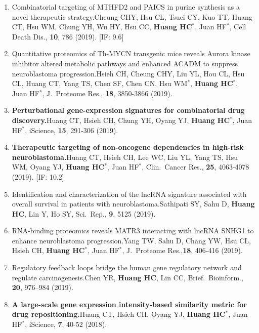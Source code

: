 \documentclass[10pt,a4paper]{article}
\def\mypub#1#2#3{{#1.}\newline #2, #3.}
\def\mybpub#1#2#3{{\boldmath \bf #1.}\newline #2, #3.}
\begin{document}
\begin{enumerate}
\item
\mypub{Combinatorial targeting of MTHFD2 and PAICS in purine synthesis as a novel therapeutic strategy}
{Cheung CHY, Hsu CL, Tsuei CY, Kuo TT, Huang CT, Hsu WM, Chung YH, Wu HY, Hsu CC, {\bf Huang HC$^*$}, Juan HF$^*$}
{Cell Death Dis., {\bf 10}, 786 (2019)} 
[IF: 9.6]

\item
\mypub{Quantitative proteomics of Th-MYCN transgenic mice reveals Aurora kinase inhibitor altered metabolic pathways and enhanced ACADM to suppress neuroblastoma progression}
{Hsieh CH, Cheung CHY, Liu YL, Hou CL, Hsu CL, Huang CT, Yang TS, Chen SF, Chen CN, Hsu WM$^*$, {\bf Huang HC$^*$}, Juan HF$^*$}
{J.\ Proteome Res., {\bf 18}, 3850-3866 (2019)}

\item
\mybpub{Perturbational gene-expression signatures for combinatorial drug discovery}
{Huang CT, Hsieh CH, Chung YH, Oyang YJ, {\bf Huang HC$^*$}, Juan HF$^*$}
{iScience, {\bf 15}, 291-306 (2019)}

\item
\mybpub{Therapeutic targeting of non-oncogene dependencies in high-risk neuroblastoma}
{Huang CT, Hsieh CH, Lee WC, Liu YL, Yang TS, Hsu WM, Oyang YJ, {\bf Huang HC$^*$}, Juan HF$^*$}
{Clin.\ Cancer Res., {\bf 25}, 4063-4078 (2019)}
[IF: 10.2]

\item
\mypub{Identification and characterization of the lncRNA signature associated with overall survival in patients with neuroblastoma}
{Sathipati SY, Sahu D, {\bf Huang HC}, Lin Y, Ho SY}
{Sci.\ Rep., {\bf 9}, 5125 (2019)}

\item 
\mypub{RNA-binding proteomics reveals MATR3 interacting with lncRNA SNHG1 to enhance neuroblastoma progression}
{Yang TW, Sahu D, Chang YW, Hsu CL, Hsieh CH, {\bf Huang HC$^*$}, Juan HF$^*$}
{J.\ Proteome Res.,{\bf 18}, 406-416 (2019)}

\item
\mypub{Regulatory feedback loops bridge the human gene regulatory network and regulate carcinogenesis}
{Chen YR, {\bf Huang HC}, Lin CC}
{Brief.\ Bioinform., {\bf 20}, 976–984 (2019)}

\item 
\mybpub{A large-scale gene expression intensity-based similarity metric for drug repositioning}
{Huang CT, Hsieh CH, Oyang YJ, {\bf Huang HC$^*$}, Juan HF$^*$}
{iScience, {\bf 7}, 40-52 (2018)}


\end{enumerate}
\end{document}
